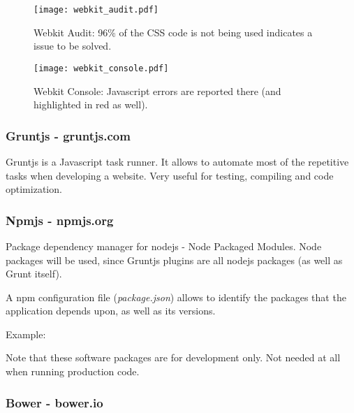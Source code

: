       \begin{figure}[ht]
        \begin{center}
          \texttt{[image: webkit\_audit.pdf]}
        \end{center}
        \caption{Webkit Audit: 96\% of the CSS code is not being used indicates a issue to be solved.}
        \label{fig:webkit_audit}
      \end{figure}

      \begin{figure}[ht]
        \begin{center}
          \texttt{[image: webkit\_console.pdf]}
        \end{center}
        \caption{Webkit Console: Javascript errors are reported there (and highlighted in red as well).}
        \label{fig:webkit_console}
      \end{figure}

      \clearpage

    \subsubsection{Gruntjs - gruntjs.com} %
      \label{ssub:gruntjs}
        Gruntjs is a Javascript task runner.
        It allows to automate most of the repetitive tasks when developing a website.
        Very useful for testing, compiling and code optimization.

    \subsubsection{Npmjs - npmjs.org} %
    \label{ssub:npm}
      Package dependency manager for nodejs - Node Packaged Modules.
      Node packages will be used, since Gruntjs plugins are all nodejs packages (as well as Grunt itself).

      A npm configuration file (\emph{package.json}) allows to identify the packages that the application depends upon, as well as its versions.

      Example: 

      

      Note that these software packages are for development only. Not needed at all when running production code.

    \subsubsection{Bower - bower.io} %
    \label{ssub:bower}
    
